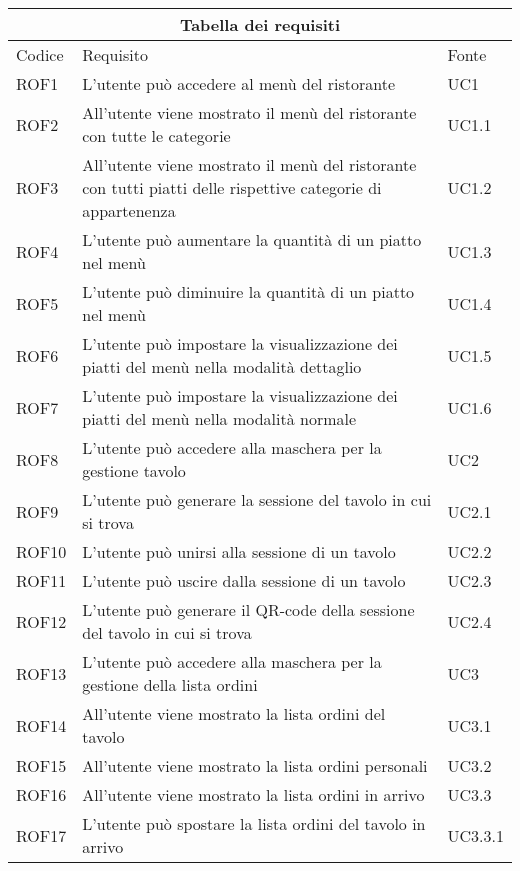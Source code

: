 \begin{center}
    \renewcommand{\arraystretch}{1.5}
    \begin{longtable}{ |p{1.5cm}|p{9cm}|p{1.5cm}|  }
        \hline
        \multicolumn{3}{|c|}{Tabella dei requisiti} \\
        \hline
        Codice&Requisito &Fonte \\
        \hline
        \endhead
        ROF1&L'utente può accedere al menù del ristorante&UC1 \\
        ROF2&All'utente viene mostrato il menù del ristorante con tutte le categorie&UC1.1 \\
        ROF3&All'utente viene mostrato il menù del ristorante con tutti piatti delle rispettive categorie di appartenenza&UC1.2 \\
        ROF4&L'utente può aumentare la quantità di un piatto nel menù&UC1.3 \\
        ROF5&L'utente può diminuire la quantità di un piatto nel menù&UC1.4 \\
        ROF6&L'utente può impostare la visualizzazione dei piatti del menù nella modalità dettaglio&UC1.5 \\
        ROF7&L'utente può impostare la visualizzazione dei piatti del menù nella modalità normale&UC1.6 \\
        ROF8&L'utente può accedere alla maschera per la gestione tavolo &UC2 \\
        ROF9&L'utente può generare la sessione del tavolo in cui si trova&UC2.1\\
        ROF10&L'utente può unirsi alla sessione di un tavolo&UC2.2 \\
        ROF11&L'utente può uscire dalla sessione di un tavolo&UC2.3\\
        ROF12&L'utente può generare il QR-code della sessione del tavolo in cui si trova&UC2.4\\
        ROF13&L'utente può accedere alla maschera per la gestione della lista ordini&UC3 \\
        ROF14&All'utente viene mostrato la lista ordini del tavolo&UC3.1 \\
        ROF15&All'utente viene mostrato la lista ordini personali &UC3.2 \\
        ROF16&All'utente viene mostrato la lista ordini in arrivo&UC3.3 \\
        ROF17&L'utente può spostare la lista ordini del tavolo in arrivo &UC3.3.1 \\

\end{longtable}
\end{center}
